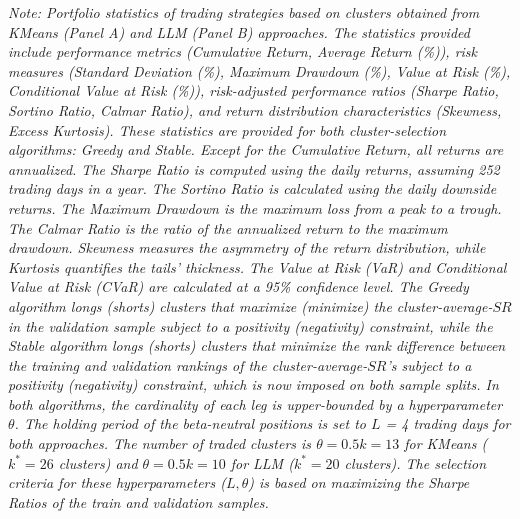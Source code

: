 \begin{table}[H]
\vspace{0.5cm}
\begin{minipage}{\textwidth}
\setlength{\parindent}{0pt}
{\small\textit{Note:
Portfolio statistics of trading strategies based on clusters obtained from KMeans (Panel A) and LLM (Panel B) approaches.
The statistics provided include performance metrics (Cumulative Return, Average Return (\%)), risk measures (Standard Deviation (\%), Maximum Drawdown (\%), Value at Risk (\%), Conditional Value at Risk (\%)), risk-adjusted performance ratios (Sharpe Ratio, Sortino Ratio, Calmar Ratio), and return distribution characteristics (Skewness, Excess Kurtosis). These statistics are provided for both cluster-selection algorithms: Greedy and Stable.
Except for the Cumulative Return, all returns are annualized. The Sharpe Ratio is computed using the daily returns, assuming 252 trading days in a year. The Sortino Ratio is calculated using the daily downside returns. The Maximum Drawdown is the maximum loss from a peak to a trough. The Calmar Ratio is the ratio of the annualized return to the maximum drawdown. Skewness measures the asymmetry of the return distribution, while Kurtosis quantifies the tails' thickness. The Value at Risk (VaR) and Conditional Value at Risk (CVaR) are calculated at a 95\% confidence level.
The Greedy algorithm longs (shorts) clusters that maximize (minimize) the cluster-average-$SR$ in the validation sample subject to a positivity (negativity) constraint, while the Stable algorithm longs (shorts) clusters that minimize the rank difference between the training and validation rankings of the cluster-average-$SR$'s subject to a positivity (negativity) constraint, which is now imposed on both sample splits. In both algorithms, the cardinality of each leg is upper-bounded by a hyperparameter $\theta$.
The holding period of the beta-neutral positions is set to $L$ = 4 trading days for both approaches. The number of traded clusters is $\theta = 0.5k=13$ for KMeans ($k^*=26$ clusters) and $\theta = 0.5k=10$ for LLM ($k^*=20$ clusters). The selection criteria for these hyperparameters ($L,\theta$) is based on maximizing the Sharpe Ratios of the train and validation samples.
}}
\end{minipage}
\end{table}